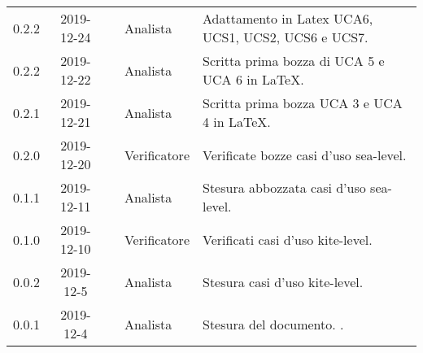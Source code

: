 {\begin{longtable}{ c c  C{4cm}  C{3cm} C{4cm}}
0.2.2 & 2019-12-24 & \DF{} & Analista & Adattamento in Latex UCA6, UCS1, UCS2, UCS6 e UCS7. \\

0.2.2 & 2019-12-22 & \PF{} & Analista & Scritta prima bozza di UCA 5 e UCA 6 in LaTeX. \\

0.2.1 & 2019-12-21 & \PF{} & Analista & Scritta prima bozza UCA 3 e UCA 4 in LaTeX. \\

0.2.0 & 2019-12-20 & \SE{} & Verificatore & Verificate bozze casi d'uso sea-level. \\

0.1.1 & 2019-12-11 & \DF{} & Analista & Stesura abbozzata casi d'uso sea-level. \\

0.1.0 & 2019-12-10 & \BR{} & Verificatore & Verificati casi d'uso kite-level. \\

0.0.2 & 2019-12-5 & \CE{} & Analista & Stesura casi d'uso kite-level. \\

0.0.1 & 2019-12-4 & \CE{} & Analista & Stesura del documento. . \\		
		
\end{longtable}
}
